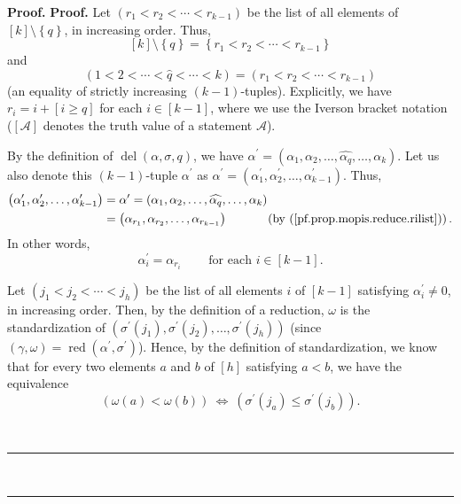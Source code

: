 \documentclass[numbers=enddot,12pt,final,onecolumn,notitlepage]{scrartcl}%
\theoremstyle{definition}
\newenvironment{fineprint}{\begin{small}}{\end{small}}
\newenvironment{proof}[1][Proof]{\noindent\textbf{#1.} }{\ \rule{0.5em}{0.5em}}
\begin{document}
\begin{fineprint}
\begin{proof}
\begin{proof}
Let $\left(  r_{1}<r_{2}<\cdots<r_{k-1}\right)  $ be the list of all elements
of $\left[  k\right]  \setminus\left\{  q\right\}  $, in increasing order.
Thus,%
\[
\left[  k\right]  \setminus\left\{  q\right\}  =\left\{  r_{1}<r_{2}%
<\cdots<r_{k-1}\right\}
\]
and%
\begin{equation}
\left(  1<2<\cdots<\widehat{q}<\cdots<k\right)  =\left(  r_{1}<r_{2}%
<\cdots<r_{k-1}\right)  \label{pf.prop.mopis.reduce.rilist}%
\end{equation}
(an equality of strictly increasing $\left(  k-1\right)  $-tuples).
Explicitly, we have $r_{i}=i+\left[  i\geq q\right]  $ for each $i\in\left[
k-1\right]  $, where we use the Iverson bracket notation ($\left[
\mathcal{A}\right]  $ denotes the truth value of a statement $\mathcal{A}$).

By the definition of $\operatorname*{del}\left(  \alpha,\sigma,q\right)  $, we
have $\alpha^{\prime}=\left(  \alpha_{1},\alpha_{2},\ldots,\widehat{\alpha
_{q}},\ldots,\alpha_{k}\right)  $. Let us also denote this $\left(
k-1\right)  $-tuple $\alpha^{\prime}$ as $\alpha^{\prime}=\left(  \alpha
_{1}^{\prime},\alpha_{2}^{\prime},\ldots,\alpha_{k-1}^{\prime}\right)  $.
Thus,%
\begin{align*}
\left(  \alpha_{1}^{\prime},\alpha_{2}^{\prime},\ldots,\alpha_{k-1}^{\prime
}\right)   &  =\alpha^{\prime}=\left(  \alpha_{1},\alpha_{2},\ldots
,\widehat{\alpha_{q}},\ldots,\alpha_{k}\right) \\
&  =\left(  \alpha_{r_{1}},\alpha_{r_{2}},\ldots,\alpha_{r_{k-1}}\right)
\ \ \ \ \ \ \ \ \ \ \left(  \text{by (\ref{pf.prop.mopis.reduce.rilist}%
)}\right)  .
\end{align*}
In other words,%
\begin{equation}
\alpha_{i}^{\prime}=\alpha_{r_{i}}\ \ \ \ \ \ \ \ \ \ \text{for each }%
i\in\left[  k-1\right]  . \label{pf.prop.mopis.reduce.aap}%
\end{equation}


Let $\left(  j_{1}<j_{2}<\cdots<j_{h}\right)  $ be the list of all elements
$i$ of $\left[  k-1\right]  $ satisfying $\alpha_{i}^{\prime}\neq0$, in
increasing order. Then, by the definition of a reduction, $\omega$ is the
standardization of $\left(  \sigma^{\prime}\left(  j_{1}\right)
,\sigma^{\prime}\left(  j_{2}\right)  ,\ldots,\sigma^{\prime}\left(
j_{h}\right)  \right)  $ (since $\left(  \gamma,\omega\right)
=\operatorname*{red}\left(  \alpha^{\prime},\sigma^{\prime}\right)  $). Hence,
by the definition of standardization, we know that for every two elements $a$
and $b$ of $\left[  h\right]  $ satisfying $a<b$, we have the equivalence%
\begin{equation}
\left(  \omega\left(  a\right)  <\omega\left(  b\right)  \right)
\ \Longleftrightarrow\ \left(  \sigma^{\prime}\left(  j_{a}\right)  \leq
\sigma^{\prime}\left(  j_{b}\right)  \right)  .
\label{pf.prop.mopis.reduce.equiv1}%
\end{equation}



\end{proof}
\end{proof}
\end{fineprint}
\end{document}
